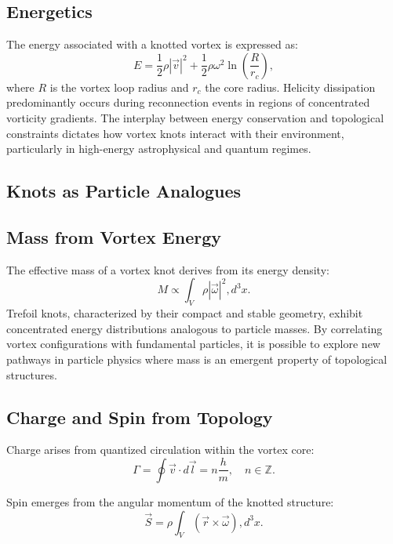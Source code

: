 \subsection*{Energetics}


The energy associated with a knotted vortex is expressed as:
\begin{equation}
E = \frac{1}{2} \rho |\vec{v}|^2 + \frac{1}{2} \rho \omega^2 \ln \left( \frac{R}{r_c} \right),
\end{equation}
where $R$ is the vortex loop radius and $r_c$ the core radius. Helicity dissipation predominantly occurs during reconnection events in regions of concentrated vorticity gradients. The interplay between energy conservation and topological constraints dictates how vortex knots interact with their environment, particularly in high-energy astrophysical and quantum regimes.


\subsection*{Knots as Particle Analogues}


\subsection*{Mass from Vortex Energy}


The effective mass of a vortex knot derives from its energy density:
\begin{equation}
M \propto \int_V \rho |\vec{\omega}|^2 , d^3x.
\end{equation}
Trefoil knots, characterized by their compact and stable geometry, exhibit concentrated energy distributions analogous to particle masses. By correlating vortex configurations with fundamental particles, it is possible to explore new pathways in particle physics where mass is an emergent property of topological structures.


\subsection*{Charge and Spin from Topology}


Charge arises from quantized circulation within the vortex core:
\begin{equation}
\Gamma = \oint \vec{v} \cdot d\vec{l} = n \frac{h}{m}, \quad n \in \mathbb{Z}.
\end{equation}


Spin emerges from the angular momentum of the knotted structure:
\begin{equation}
\vec{S} = \rho \int_V (\vec{r} \times \vec{\omega}) , d^3x.
\end{equation}


